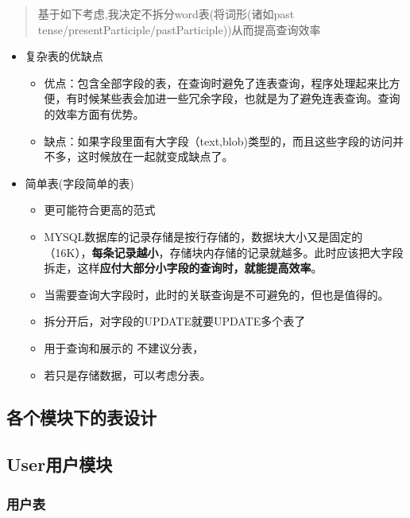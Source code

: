\documentclass[
]{article}
\begin{document}
\begin{quote}
基于如下考虑,我决定不拆分word表(将词形(诸如past
tense/presentParticiple/pastParticiple))从而提高查询效率
\end{quote}

\begin{itemize}
\item
  复杂表的优缺点

  \begin{itemize}
  \item
    优点：包含全部字段的表，在查询时避免了连表查询，程序处理起来比方便，有时候某些表会加进一些冗余字段，也就是为了避免连表查询。查询的效率方面有优势。
  \item
    缺点：如果字段里面有大字段（text,blob)类型的，而且这些字段的访问并不多，这时候放在一起就变成缺点了。
  \end{itemize}
\item
  简单表(字段简单的表)

  \begin{itemize}
  \item
    更可能符合更高的范式
  \item
    MYSQL数据库的记录存储是按行存储的，数据块大小又是固定的（16K），\textbf{每条记录越小}，存储块内存储的记录就越多。此时应该把大字段拆走，这样\textbf{应付大部分小字段的查询时，就能提高效率}。
  \item
    当需要查询大字段时，此时的关联查询是不可避免的，但也是值得的。
  \item
    拆分开后，对字段的UPDATE就要UPDATE多个表了
  \item
    用于查询和展示的 不建议分表，
  \item
    若只是存储数据，可以考虑分表。
  \end{itemize}
\end{itemize}

\hypertarget{ux5404ux4e2aux6a21ux5757ux4e0bux7684ux8868ux8bbeux8ba1}{%
\subsection{各个模块下的表设计}\label{ux5404ux4e2aux6a21ux5757ux4e0bux7684ux8868ux8bbeux8ba1}}

\hypertarget{userux7528ux6237ux6a21ux5757}{%
\subsection{User用户模块}\label{userux7528ux6237ux6a21ux5757}}

\hypertarget{ux7528ux6237ux8868}{%
\subsubsection{用户表}\label{ux7528ux6237ux8868}}
\end{document}
